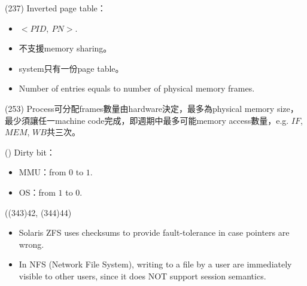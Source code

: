 \begin{theorem}{(237)} Inverted page table：\begin{itemize}
        \item $<PID, \ PN>$.
        \item 不支援memory sharing。
        \item system只有一份page table。
        \item Number of entries equals to number of physical memory frames.
    \end{itemize}
\end{theorem}

\begin{theorem}{(253)} Process可分配frames數量由hardware決定，最多為physical memory size，最少須讓任一machine code完成，即週期中最多可能memory access數量，e.g. $IF$, $MEM$, $WB$共三次。
\end{theorem}

\begin{theorem}{()} Dirty bit：\begin{itemize}
        \item MMU：from $0$ to $1$.
        \item OS：from $1$ to $0$.
    \end{itemize}
\end{theorem}

\begin{theorem}{((343)42, (344)44)} \quad\quad \begin{itemize}
        \item Solaris ZFS uses checksums to provide fault-tolerance in case pointers are wrong.
        \item In NFS (Network File System), writing to a file by a user are immediately visible to other users, since it does NOT support session semantics.
    \end{itemize}
\end{theorem}
